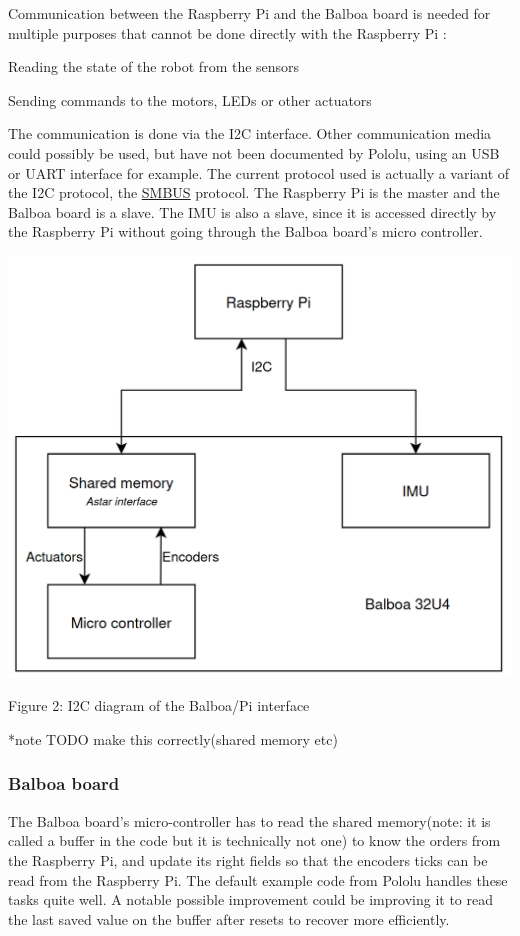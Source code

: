\documentclass{article}
\begin{document}
Communication between the Raspberry Pi and the Balboa board is needed for multiple purposes
that cannot be done directly with the Raspberry Pi :

\begin{list}{-}{}
    \item Reading the state of the robot from the sensors
    \item Sending commands to the motors, LEDs or other actuators
\end{list}

The communication is done via the I2C interface.
Other communication media could possibly be used, but have not been documented by Pololu,
using an USB or UART interface for example.
The current protocol used is actually a variant of the I2C protocol, the
\href{https://en.wikipedia.org/wiki/System_Management_Bus}{SMBUS} protocol.
The Raspberry Pi is the master and the Balboa board is a slave.
The IMU is also a slave, since it is accessed directly by the Raspberry Pi without
going through the Balboa board's micro controller.

\begin{center}

    \includegraphics[scale=0.25]{img/i2c-interface-diagram.png}

    Figure 2: I2C diagram of the Balboa/Pi interface

\end{center}
*note TODO make this correctly(shared memory etc)

\subsubsection{Balboa board}

The Balboa board's micro-controller has to read the shared memory(note: it is called a buffer in
the code but it is technically not one) to know the orders from the Raspberry Pi, and update its
right fields so that the encoders ticks can be read from the Raspberry Pi.
The default example code from Pololu handles these tasks quite well. A notable possible
improvement could be improving it to read the last saved value on the buffer after resets to
recover more efficiently.
\end{document}

